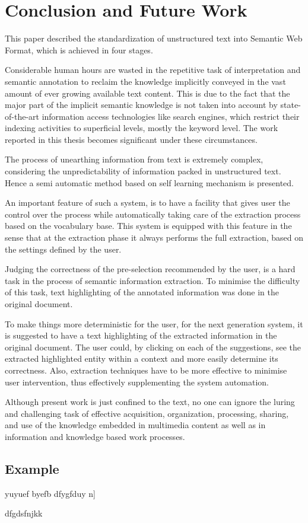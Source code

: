 \chapter{\label{res}Conclusion and Future Work}
This paper described the standardization of unstructured text into Semantic Web Format, which is achieved in four stages.

Considerable human hours are wasted in the repetitive task of interpretation and semantic annotation to reclaim the knowledge implicitly conveyed in the vast amount of ever growing available text content. This is due to the fact that the major part of the implicit semantic knowledge is not taken into account by state-of-the-art information access technologies like search engines, which restrict their indexing activities to superficial levels, mostly the keyword level. The work reported in this thesis becomes significant under these circumstances.  

The process of unearthing information from text is extremely complex, considering the unpredictability of information packed in unstructured text. Hence a semi automatic method based on self learning mechanism is presented. 

An important feature of such a system, is to have a facility that gives user the control over the process while automatically taking care of the extraction process based on the vocabulary base. This system is equipped with this feature in the sense that at the extraction
phase it always performs the full extraction, based on the settings defined by the user. 

Judging the correctness of the pre-selection recommended by the user, is a hard task in the process of semantic information extraction. To minimise the difficulty of this task, text highlighting of the annotated information was done in the original document. 

To make things more deterministic for the user, for the next generation system, it is suggested to have a text highlighting of the extracted  information in the original document. The user could, by clicking on each of the suggestions, see the extracted highlighted entity within a context and more easily determine its correctness. Also, extraction techniques have to be more effective to minimise user intervention, thus effectively supplementing the system automation. 

Although present work is just confined to the text, no one can ignore the luring and challenging task of effective acquisition, organization, processing, sharing, and use of the knowledge embedded in multimedia content as well as in information and knowledge based work processes. 
\section{Example}
\label{sec:Sevt}
yuyuef byefb  
dfygfduy n]

dfgdsfnjkk